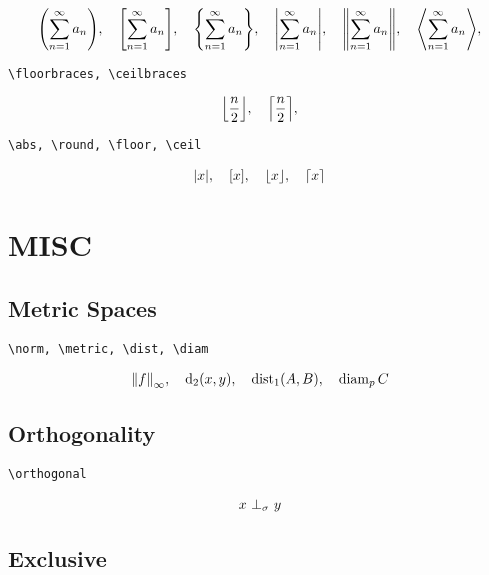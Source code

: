 \documentclass{article}
\begin{document}
\begin{align*}
    \pbraces{\sum_{n=1}^\infty a_n},
    \quad
    \bbraces{\sum_{n=1}^\infty a_n},
    \quad
    \Bbraces{\sum_{n=1}^\infty a_n},
    \quad
    \vbraces{\sum_{n=1}^\infty a_n},
    \quad
    \Vbraces{\sum_{n=1}^\infty a_n},
    \quad
    \abraces{\sum_{n=1}^\infty a_n},
\end{align*}

\verb|\floorbraces, \ceilbraces|

\begin{align*}
    \floorbraces{\frac{n}{2}},
    \quad
    \ceilbraces{\frac{n}{2}},
\end{align*}

\verb|\abs, \round, \floor, \ceil|

\begin{align*}
    \abs{x},
    \quad
    \round{x},
    \quad
    \floor{x},
    \quad
    \ceil{x}
\end{align*}


\section{MISC}

\subsection{Metric Spaces}

\verb|\norm, \metric, \dist, \diam|

\begin{align*}
    \norm[\infty]{f},
    \quad
    \metric_2(x, y),
    \quad
    \dist_1(A, B),
    \quad
    \diam_p C
\end{align*}

\subsection{Orthogonality}

\verb|\orthogonal|

\begin{align*}
    \orthogonal[\sigma]{x}{y}
\end{align*}

\subsection{Exclusive }
\end{document}
